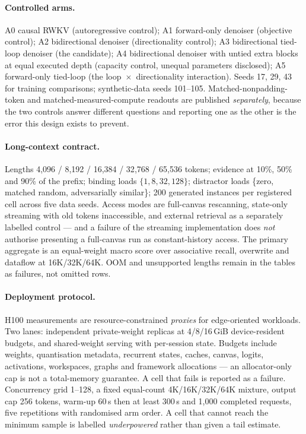 \documentclass[11pt]{article}
\begin{document}
\paragraph{Controlled arms.} A0 causal RWKV (autoregressive control); A1 forward-only
denoiser (objective control); A2 bidirectional denoiser (directionality control); A3
bidirectional tied-loop denoiser (the candidate); A4 bidirectional denoiser with untied
extra blocks at equal executed depth (capacity control, unequal parameters disclosed);
A5 forward-only tied-loop (the loop~$\times$~directionality interaction). Seeds 17, 29,
43 for training comparisons; synthetic-data seeds 101--105. Matched-nonpadding-token and
matched-measured-compute readouts are published \emph{separately}, because the two
controls answer different questions and reporting one as the other is the error this
design exists to prevent.

\paragraph{Long-context contract.} Lengths 4{,}096 / 8{,}192 / 16{,}384 / 32{,}768 /
65{,}536 tokens; evidence at 10\%, 50\% and 90\% of the prefix; binding loads
$\{1,8,32,128\}$; distractor loads \{zero, matched random, adversarially similar\}; 200
generated instances per registered cell across five data seeds. Access modes are
full-canvas rescanning, state-only streaming with old tokens inaccessible, and external
retrieval as a separately labelled control --- and a failure of the streaming
implementation does \emph{not} authorise presenting a full-canvas run as
constant-history access. The primary aggregate is an equal-weight macro score over
associative recall, overwrite and dataflow at 16K/32K/64K. OOM and unsupported lengths
remain in the tables as failures, not omitted rows.

\paragraph{Deployment protocol.} H100 measurements are resource-constrained
\emph{proxies} for edge-oriented workloads. Two lanes: independent private-weight
replicas at 4/8/16\,GiB device-resident budgets, and shared-weight serving with
per-session state. Budgets include weights, quantisation metadata, recurrent states,
caches, canvas, logits, activations, workspaces, graphs and framework allocations --- an
allocator-only cap is not a total-memory guarantee. A cell that fails is reported as a
failure. Concurrency grid 1--128, a fixed equal-count 4K/16K/32K/64K mixture, output cap
256 tokens, warm-up 60\,s then at least 300\,s and 1{,}000 completed requests, five
repetitions with randomised arm order. A cell that cannot reach the minimum sample is
labelled \emph{underpowered} rather than given a tail estimate.
\end{document}
